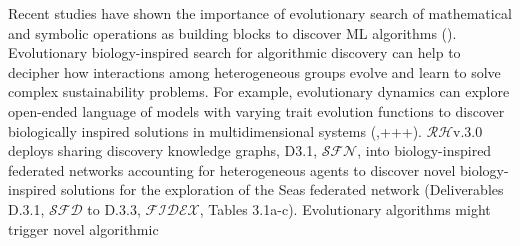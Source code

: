 \documentclass[11pt, a4paper]{article} %
\begin{document}
Recent studies have shown the importance of evolutionary search of
mathematical and symbolic operations as building blocks to discover ML
algorithms (\citep{Real2020,Guimera2020}). Evolutionary
biology-inspired search for algorithmic discovery can help to decipher
how interactions among heterogeneous groups evolve and learn to solve
complex sustainability problems. For example, evolutionary dynamics
can explore open-ended language of models with varying trait evolution
functions to discover biologically inspired solutions in
multidimensional systems (\citep{Real2020},+++). $\mathcal{RH}$v.3.0
deploys sharing discovery knowledge graphs, D3.1, $\mathcal{SFN}$,
into biology-inspired federated networks accounting for heterogeneous
agents to discover novel biology-inspired solutions for the
exploration of the Seas federated network (Deliverables D.3.1,
$\mathcal{SFD}$ to D.3.3, $\mathcal{FIDEX}$, Tables
3.1a-c). Evolutionary algorithms might trigger novel algorithmic
\end{document}
